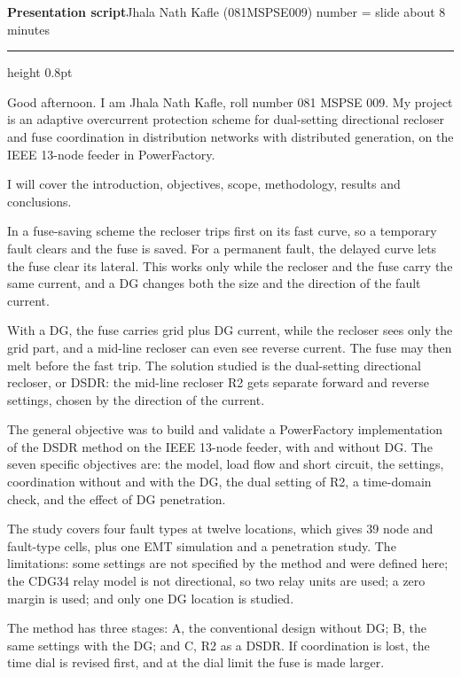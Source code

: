 \documentclass[11pt,a4paper]{article}
\newcommand{\slide}[2]{\par\vspace{4.5pt}\noindent
  \makebox[0.95cm][r]{\fontsize{13}{15}\selectfont\bfseries\color{navy}#1}\hspace{0.3cm}%
  \parbox[t]{\dimexpr\linewidth-1.25cm}{\fontsize{11.3}{14.3}\selectfont\raggedright #2}\par}
\begin{document}
{\large\bfseries\color{navy} Presentation script}\hfill{\small Jhala Nath Kafle (081MSPSE009) \quad
number = slide \quad about 8 minutes}\par\vspace{2pt}
{\color{navy}\hrule height 0.8pt}

\slide{1}{Good afternoon. I am Jhala Nath Kafle, roll number 081 MSPSE 009. My project is an adaptive overcurrent protection scheme for dual-setting directional recloser and fuse coordination in distribution networks with distributed generation, on the IEEE 13-node feeder in PowerFactory.}

\slide{2}{I will cover the introduction, objectives, scope, methodology, results and conclusions.}

\slide{3}{In a fuse-saving scheme the recloser trips first on its fast curve, so a temporary fault clears and the fuse is saved. For a permanent fault, the delayed curve lets the fuse clear its lateral. This works only while the recloser and the fuse carry the same current, and a DG changes both the size and the direction of the fault current.}

\slide{4}{With a DG, the fuse carries grid plus DG current, while the recloser sees only the grid part, and a mid-line recloser can even see reverse current. The fuse may then melt before the fast trip. The solution studied is the dual-setting directional recloser, or DSDR: the mid-line recloser R2 gets separate forward and reverse settings, chosen by the direction of the current.}

\slide{5}{The general objective was to build and validate a PowerFactory implementation of the DSDR method on the IEEE 13-node feeder, with and without DG. The seven specific objectives are: the model, load flow and short circuit, the settings, coordination without and with the DG, the dual setting of R2, a time-domain check, and the effect of DG penetration.}

\slide{6}{The study covers four fault types at twelve locations, which gives 39 node and fault-type cells, plus one EMT simulation and a penetration study. The limitations: some settings are not specified by the method and were defined here; the CDG34 relay model is not directional, so two relay units are used; a zero margin is used; and only one DG location is studied.}

\slide{7}{The method has three stages: A, the conventional design without DG; B, the same settings with the DG; and C, R2 as a DSDR. If coordination is lost, the time dial is revised first, and at the dial limit the fuse is made larger.}
\end{document}
